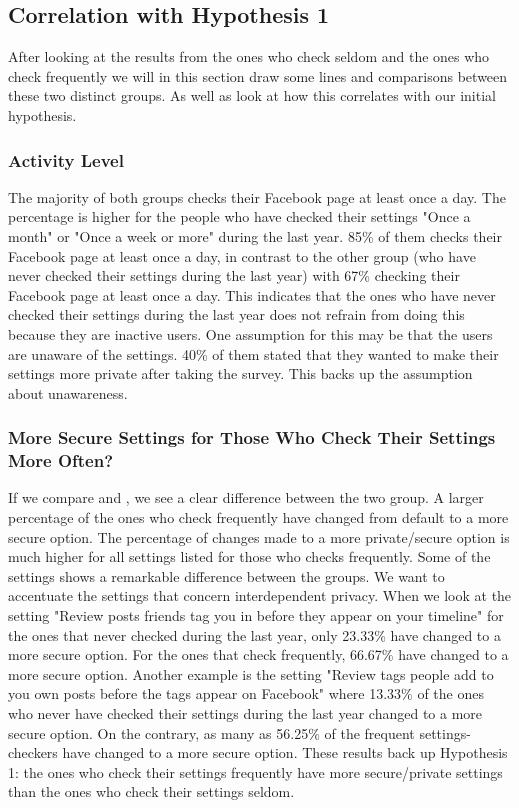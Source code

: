 \subsection{Correlation with Hypothesis 1}
After looking at the results from the ones who check seldom and the ones who check frequently we will in this section draw some lines and comparisons between these two distinct groups. As well as look at how this correlates with our initial hypothesis. 

\subsubsection{Activity Level}
The majority of both groups checks their Facebook page at least once a day. The percentage is higher for the people who have checked their settings "Once a month" or "Once a week or more" during the last year. 85\% of them checks their Facebook page at least once a day, in contrast to the other group (who have never checked their settings during the last year) with 67\% checking their Facebook page at least once a day. This indicates that the ones who have never checked their settings during the last year does not refrain from doing this because they are inactive users. One assumption for this may be that the users are unaware of the settings. 40\% of them stated that they wanted to make their settings more private after taking the survey. This backs up the assumption about unawareness.  

\subsubsection{More Secure Settings for Those Who Check Their Settings More Often?}
If we compare  and , we see a clear difference between the two group. A larger percentage of the ones who check frequently have changed from default to a more secure option. The percentage of changes made to a more private/secure option is much higher for all settings listed for those who checks frequently. Some of the settings shows a remarkable difference between the groups. We want to accentuate the settings that concern interdependent privacy. When we look at the setting "Review posts friends tag you in before they appear on your timeline" for the ones that never checked during the last year, only 23.33\% have changed to a more secure option. For the ones that check frequently, 66.67\% have changed to a more secure option. Another example is the setting "Review tags people add to you own posts before the tags appear on Facebook" where 13.33\% of the ones who never have checked their settings during the last year changed to a more secure option. On the contrary, as many as 56.25\% of the frequent settings-checkers have changed to a more secure option. These results back up Hypothesis 1: the ones who check their settings frequently have more secure/private settings than the ones who check their settings seldom. 

